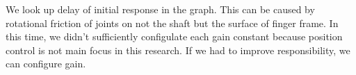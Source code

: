 \documentclass{llncs}
\begin{document}
We look up delay of initial response in the graph.
This can be caused by rotational friction of joints on not the shaft but the surface of finger frame.
In this time, we didn't sufficiently configulate each gain constant because position control is not main focus in this research.
If we had to improve responsibility, we can configure gain.

		



\end{document}
